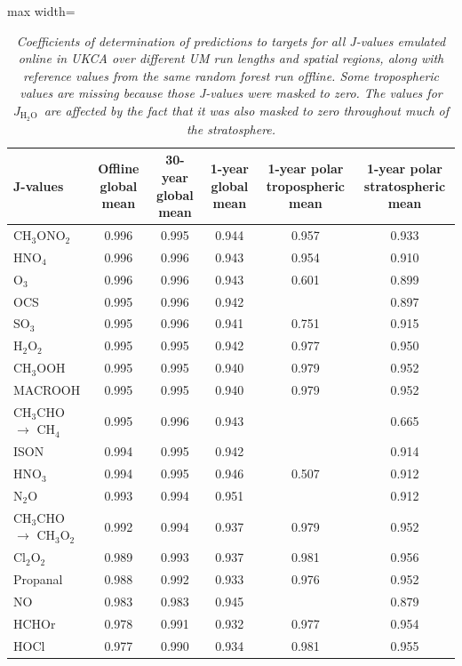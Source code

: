 \documentclass[journal abbreviation, manuscript]{copernicus}
\newcommand{\JHHO}{\ensuremath{J_{\mathrm{H_2O}}}}
\begin{document}
\begin{table}
\centering
\caption{\textit{Coefficients of determination of predictions to targets for all J-values emulated online in UKCA over different UM run lengths and spatial regions, along with reference values from the same random forest run offline. Some tropospheric values are missing because those J-values were masked to zero. The values for \JHHO\ are affected by the fact that it was also masked to zero throughout much of the stratosphere.}}
\begin{adjustbox}{max width=\textheight}
\begin{tabular}{|lccccc|}
\toprule
J-values & Offline global mean & 30-year global mean & 1-year global mean & 1-year polar tropospheric mean & 1-year polar stratospheric mean \\
\midrule
CH$_3$ONO$_2$ & 0.996 & 0.995 & 0.944 & 0.957 & 0.933 \\
HNO$_4$       & 0.996 & 0.996 & 0.943 & 0.954 & 0.910 \\
O$_3$         & 0.996 & 0.996 & 0.943 & 0.601 & 0.899 \\
OCS           & 0.995 & 0.996 & 0.942 &       & 0.897 \\
SO$_3$        & 0.995 & 0.996 & 0.941 & 0.751 & 0.915 \\
H$_2$O$_2$    & 0.995 & 0.995 & 0.942 & 0.977 & 0.950 \\
CH$_3$OOH     & 0.995 & 0.995 & 0.940 & 0.979 & 0.952 \\
MACROOH       & 0.995 & 0.995 & 0.940 & 0.979 & 0.952 \\
CH$_3$CHO $\rightarrow$ CH$_4$ & 0.995 & 0.996 & 0.943 & & 0.665 \\
ISON          & 0.994 & 0.995 & 0.942 &       & 0.914 \\
HNO$_3$       & 0.994 & 0.995 & 0.946 & 0.507 & 0.912 \\
N$_2$O        & 0.993 & 0.994 & 0.951 &       & 0.912 \\
CH$_3$CHO $\rightarrow$ CH$_3$O$_2$ & 0.992 & 0.994 & 0.937 & 0.979 & 0.952 \\
Cl$_2$O$_2$   & 0.989 & 0.993 & 0.937 & 0.981 & 0.956 \\
Propanal      & 0.988 & 0.992 & 0.933 & 0.976 & 0.952 \\
NO            & 0.983 & 0.983 & 0.945 &       & 0.879 \\
HCHOr         & 0.978 & 0.991 & 0.932 & 0.977 & 0.954 \\
HOCl          & 0.977 & 0.990 & 0.934 & 0.981 & 0.955 \\

\end{tabular}
\end{adjustbox}
\end{table}
\end{document}
